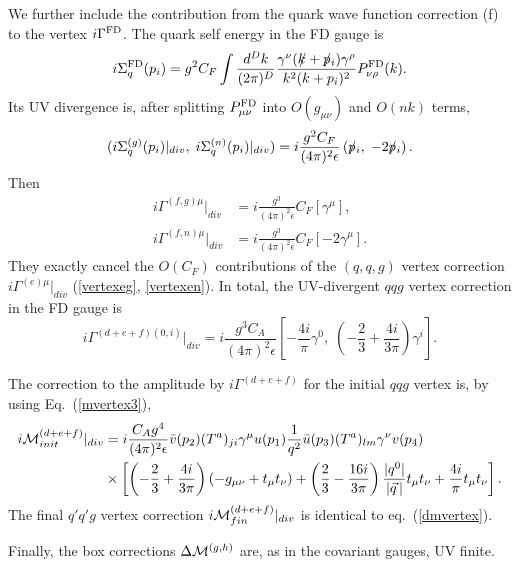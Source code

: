 \documentclass[preprint,amsmath,amssymb,superscriptaddress, floatfix,nofootinbib]{revtex4}
\def\psla{p\kern-.45em/}
\def\ksla{k\kern-.45em/}
\begin{document}
We further include the contribution from the quark wave function correction (f) 
to the vertex $i\Gamma^{\rm FD}$. 
The quark self energy in the FD gauge is 
\begin{equation}
i\Sigma_q^{\rm FD}(p_i) = g^2 C_F \int \frac{d^D k}{(2\pi)^D}
\frac{\gamma^{\nu}(\ksla+\psla_i)\gamma^{\rho}}{k^2(k+p_i)^2} P_{\nu\rho}^{\rm FD}(k) .
\end{equation}
%
Its UV divergence is, after splitting $P_{\mu\nu}^{\rm FD}$ into $O(g_{\mu\nu})$ and $O(nk)$ terms, 
%
\begin{equation}
(i\Sigma_q^{(g)}(p_i)|_{div} , \; i\Sigma_q^{(n)}(p_i)|_{div}  )
= i\frac{g^2 C_F}{(4\pi)^2\epsilon}  \left(  \psla_i, \;  - 2\psla_i  \right)  .
\end{equation}
%
Then   
\begin{align}
i\Gamma^{(f,g)\mu} |_{div} & =i\frac{g^3}{(4\pi)^2\epsilon} C_F 
\left[ \gamma^{\mu}  \right] , \label{vertexfg}
\\
i\Gamma^{(f,n)\mu} |_{div} & =i\frac{g^3}{(4\pi)^2\epsilon} C_F 
\left[ -2\gamma^{\mu} \right] .  \label{vertexfn}
\end{align}
They exactly cancel the $O(C_F)$ contributions of the $(q,q,g)$ vertex correction $i\Gamma^{(e)\mu}|_{div}$ 
(\ref{vertexeg}, \ref{vertexen}). 
%
In total, the UV-divergent ${q}qg$ vertex correction in the FD gauge is 
\begin{equation}
i\Gamma^{(d+e+f)(0,i)}|_{div} = i\frac{g^3 C_A }{(4\pi)^2\epsilon} 
\left[ -\frac{4i}{\pi}\gamma^0, \; \left( -\frac{2}{3}+\frac{4i}{3\pi} \right) \gamma^i 
\right] . 
\label{vertexdef}
\end{equation}

The correction to the amplitude by $i\Gamma^{(d+e+f)}$ 
for the initial ${q}qg$ vertex is, by using Eq.~(\ref{mvertex3}), 
\begin{align}
i{\cal M}^{(d+e+f)}_{init}|_{div} & =  i\frac{C_A g^4}{(4\pi)^2\epsilon} 
\bar{v}(p_2)(T^a)_{ji}\gamma^{\mu}u(p_1) \frac{1}{q^2}\bar{u}(p_3)(T^a)_{lm}
\gamma^{\nu} v(p_4)
\nonumber \\
& \times \left[ \left( -\frac{2}{3}+\frac{4i}{3\pi} \right) 
(-g_{\mu\nu}+t_{\mu}t_{\nu}) + \left( \frac{2}{3}-\frac{16i}{3\pi} \right) 
\frac{|q^0|}{|\vec{q}\,|} t_{\mu}t_{\nu} +\frac{4i}{\pi} t_{\mu} t_{\nu} \right] .
\label{dmvertex} 
\end{align}
%
The 
final ${q}'q'g$ vertex correction $i{\cal M}^{(d+e+f)}_{fin}|_{div}$ is identical to eq.~(\ref{dmvertex}). 

Finally, the box corrections $\Delta{\cal M}^{(g,h)}$ are, 
as in the covariant gauges, UV finite. 
\end{document}
